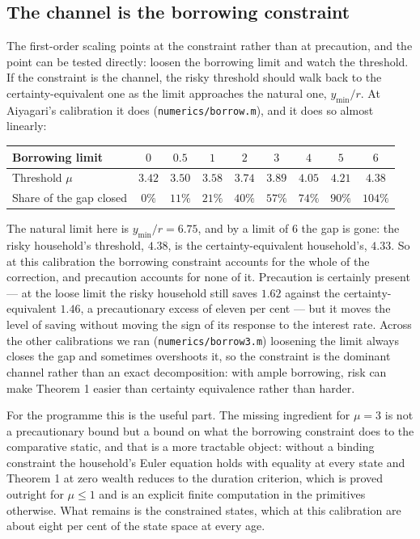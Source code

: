 \subsection{The channel is the borrowing constraint}

The first-order scaling points at the constraint rather than at precaution, and the point can be
tested directly: loosen the borrowing limit and watch the threshold. If the constraint is the
channel, the risky threshold should walk back to the certainty-equivalent one as the limit
approaches the natural one, $y_{\min}/r$. At Aiyagari's calibration it does
(\texttt{numerics/borrow.m}), and it does so almost linearly:

\begingroup\small
\begin{center}
\begin{tabular}{@{}lcccccccc@{}}
\toprule
Borrowing limit & $0$ & $0.5$ & $1$ & $2$ & $3$ & $4$ & $5$ & $6$\\
\midrule
Threshold $\mu$ & $3.42$ & $3.50$ & $3.58$ & $3.74$ & $3.89$ & $4.05$ & $4.21$ & $4.38$\\
Share of the gap closed & $0\%$ & $11\%$ & $21\%$ & $40\%$ & $57\%$ & $74\%$ & $90\%$ & $104\%$\\
\bottomrule
\end{tabular}
\end{center}
\endgroup

The natural limit here is $y_{\min}/r=6.75$, and by a limit of $6$ the gap is gone: the risky
household's threshold, $4.38$, is the certainty-equivalent household's, $4.33$. So at this
calibration the borrowing constraint accounts for the whole of the correction, and precaution
accounts for none of it. Precaution is certainly present --- at the loose limit the risky
household still saves $1.62$ against the certainty-equivalent $1.46$, a precautionary excess of
eleven per cent --- but it moves the level of saving without moving the sign of its response to
the interest rate. Across the other calibrations we ran (\texttt{numerics/borrow3.m}) loosening
the limit always closes the gap and sometimes overshoots it, so the constraint is the dominant
channel rather than an exact decomposition: with ample borrowing, risk can make Theorem 1 easier
than certainty equivalence rather than harder.

For the programme this is the useful part. The missing ingredient for $\mu=3$ is not a
precautionary bound but a bound on what the borrowing constraint does to the comparative static,
and that is a more tractable object: without a binding constraint the household's Euler equation
holds with equality at every state and Theorem 1 at zero wealth reduces to the duration criterion,
which is proved outright for $\mu\le1$ and is an explicit finite computation in the primitives
otherwise. What remains is the constrained states, which at this calibration are about eight per
cent of the state space at every age.

